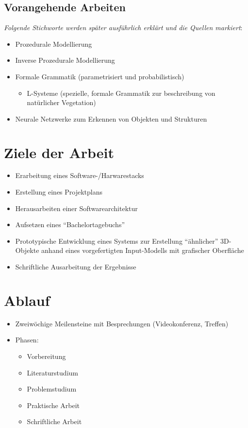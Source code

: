 \documentclass[11pt]{article}
\begin{document}
    \subsection{Vorangehende Arbeiten}
    \textit{Folgende Stichworte werden später ausführlich erklärt und die Quellen markiert}:
    \begin{itemize}
        \item Prozedurale Modellierung
        \item Inverse Prozedurale Modellierung
        \item Formale Grammatik (parametrisiert und probabilistisch)
        \begin{itemize}
            \item L-Systeme (spezielle, formale Grammatik zur beschreibung von natürlicher Vegetation)
        \end{itemize}
        \item Neurale Netzwerke zum Erkennen von Objekten und Strukturen
    \end{itemize}


    \section{Ziele der Arbeit}
    \begin{itemize}
        \item Erarbeitung eines Software-/Harwarestacks
        \item Erstellung eines Projektplans
        \item Herausarbeiten einer Softwarearchitektur
        \item Aufsetzen eines "`Bachelortagebuchs"'
        \item Prototypische Entwicklung eines Systems zur Erstellung "`ähnlicher"' 3D-Objekte anhand eines
        vorgefertigten Input-Modells mit grafischer Oberfläche
        \item Schriftliche Ausarbeitung der Ergebnisse
    \end{itemize}

    \section{Ablauf}
    \begin{itemize}
        \item Zweiwöchige Meilensteine mit Besprechungen (Videokonferenz, Treffen)
        \item Phasen:
        \begin{itemize}
            \item Vorbereitung
            \item Literaturstudium
            \item Problemstudium
            \item Praktische Arbeit
            \item Schriftliche Arbeit
        \end{itemize}
    \end{itemize}
\end{document}
